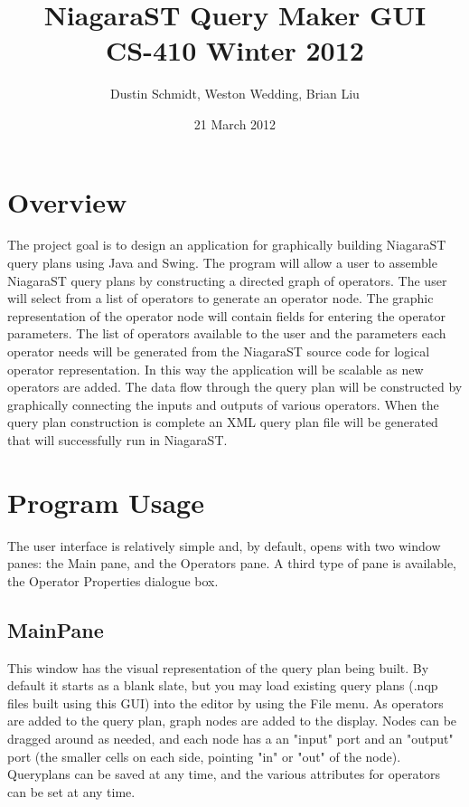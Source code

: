 \documentclass{article}
\title{NiagaraST Query Maker GUI\\
CS-410 Winter 2012}
\author{Dustin Schmidt, Weston Wedding, Brian Liu}
\date{21 March 2012}
\begin{document}
\maketitle
\tableofcontents
	\section{Overview}
	The project goal is to design an application for graphically building NiagaraST query plans using Java and Swing. The program will allow a user to assemble NiagaraST query plans by constructing a directed graph of operators.  The user will select from a list of operators to generate an operator node.  The graphic representation of the operator node will contain fields for entering the operator parameters.  The list of operators available to the user and the parameters each operator needs will be generated from the NiagaraST source code for logical operator representation.  In this way the application will be scalable as new operators are added. The data flow through the query plan will be constructed by graphically connecting the inputs and outputs of various operators.  When the query plan construction is complete an XML query plan file will be generated that will successfully run in NiagaraST. 
\section{Program Usage} The user interface is relatively simple and, by default, opens with two window panes: the Main pane, and the Operators pane.  A third type of pane is available, the Operator Properties dialogue box.
\subsection{MainPane}  This window has the visual representation of the query plan being built.  By default it starts as a blank slate, but you may load existing query plans (.nqp files built using this GUI) into the editor by using the File menu.  As operators are added to the query plan, graph nodes are added to the display.  Nodes can be dragged around as needed, and each node has a an "input" port and an "output" port (the smaller cells on each side, pointing "in" or "out" of the node).  Queryplans can be saved at any time, and the various attributes for operators can be set at any time.
\end{document}
